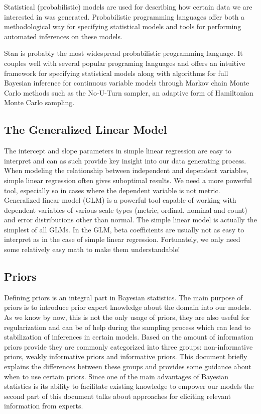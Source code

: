 \documentclass[fleqn,moreauthors,10pt]{ds_report}
\begin{document}
Statistical (probabilistic) models are used for describing how certain data we are interested in was generated. Probabilistic programming languages offer both a methodological way for specifying statistical models and tools for performing automated inferences on these models.

Stan is probably the most widespread probabilistic programming language. It couples well with several popular programing languages and offers an intuitive framework for specifying statistical models along with algorithms for full Bayesian inference for continuous variable models through Markov chain Monte Carlo methods such as the No-U-Turn sampler, an adaptive form of Hamiltonian Monte Carlo sampling.

\subsection*{The Generalized Linear Model}

The intercept and slope parameters in simple linear regression are easy to interpret and can as such provide key insight into our data generating process. When modeling the relationship between independent and dependent variables, simple linear regression often gives suboptimal results. We need a more powerful tool, especially so in cases where the dependent variable is not metric. Generalized linear model (GLM) is a powerful tool capable of working with dependent variables of various scale types (metric, ordinal, nominal and count) and error distributions other than normal. The simple linear model is actually the simplest of all GLMs. In the GLM, beta coefficients are usually not as easy to interpret as in the case of simple linear regression. Fortunately, we only need some relatively easy math to make them understandable!

\subsection*{Priors}

Defining priors is an integral part in Bayesian statistics. The main purpose of priors is to introduce prior expert knowledge about the domain into our models. As we know by now, this is not the only usage of priors, they are also useful for regularization and can be of help during the sampling process which can lead to stabilization of inferences in certain models. Based on the amount of information priors provide they are commonly categorized into three groups: non-informative priors, weakly informative priors and informative priors. This document briefly explains the differences between these groups and provides some guidance about when to use certain priors. Since one of the main advantages of Bayesian statistics is its ability to facilitate existing knowledge to empower our models the second part of this document talks about approaches for eliciting relevant information from experts.
\end{document}
